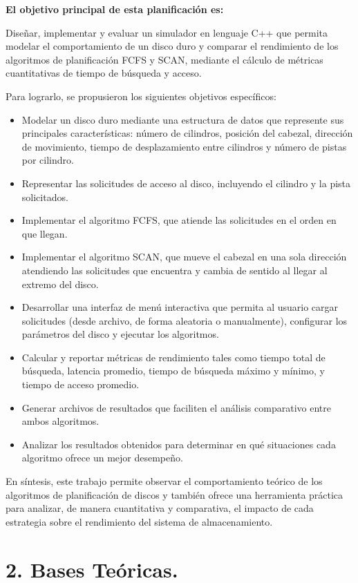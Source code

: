 \documentclass[14pt,letterpaper]{extarticle}
\begin{document}
\textbf{El objetivo principal de esta planificación es:}

Diseñar, implementar y evaluar un simulador en lenguaje C++ que permita modelar el comportamiento de un disco duro y comparar el rendimiento de los algoritmos de planificación FCFS y SCAN, mediante el cálculo de métricas cuantitativas de tiempo de búsqueda y acceso.

Para lograrlo, se propusieron los siguientes objetivos específicos:

\begin{itemize}
    \item Modelar un disco duro mediante una estructura de datos que represente sus principales características: número de cilindros, posición del cabezal, dirección de movimiento, tiempo de desplazamiento entre cilindros y número de pistas por cilindro.
    \item Representar las solicitudes de acceso al disco, incluyendo el cilindro y la pista solicitados.
    \item Implementar el algoritmo FCFS, que atiende las solicitudes en el orden en que llegan.
    \item Implementar el algoritmo SCAN, que mueve el cabezal en una sola dirección atendiendo las solicitudes que encuentra y cambia de sentido al llegar al extremo del disco.
    \item Desarrollar una interfaz de menú interactiva que permita al usuario cargar solicitudes (desde archivo, de forma aleatoria o manualmente), configurar los parámetros del disco y ejecutar los algoritmos.
    \item Calcular y reportar métricas de rendimiento tales como tiempo total de búsqueda, latencia promedio, tiempo de búsqueda máximo y mínimo, y tiempo de acceso promedio.
    \item Generar archivos de resultados que faciliten el análisis comparativo entre ambos algoritmos.
    \item Analizar los resultados obtenidos para determinar en qué situaciones cada algoritmo ofrece un mejor desempeño.
\end{itemize}

En síntesis, este trabajo permite observar el comportamiento teórico de los algoritmos de planificación de discos y también ofrece una herramienta práctica para analizar, de manera cuantitativa y comparativa, el impacto de cada estrategia sobre el rendimiento del sistema de almacenamiento.

\section*{2. Bases Teóricas.}
\end{document}
